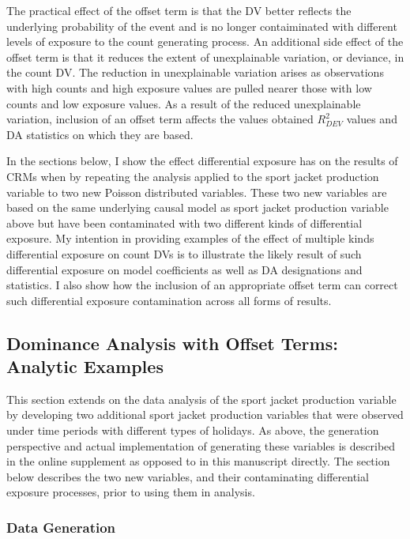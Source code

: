 \documentclass[ShortAfour,times,sageapa]{sagej}
\begin{document}
	The practical effect of the offset term is that the DV better reflects the underlying probability of the event and is no longer contaiminated with different levels of exposure to the count generating process.
	An additional side effect of the offset term is that it reduces the extent of unexplainable variation, or deviance, in the count DV.
	The reduction in unexplainable variation arises as observations with high counts and high exposure values are pulled nearer those with low counts and low exposure values.	
	As a result of the reduced unexplainable variation, inclusion of an offset term affects the values obtained $R^2_{DEV}$ values and DA statistics on which they are based.
	
	In the sections below, I show the effect differential exposure has on the results of CRMs when by repeating the analysis applied to the sport jacket production variable to two new Poisson distributed variables.
	These two new variables are based on the same underlying causal model as sport jacket production variable above but have been contaminated with two different kinds of differential exposure.
	My intention in providing examples of the effect of multiple kinds differential exposure on count DVs is to illustrate the likely result of such differential exposure on model coefficients as well as DA designations and statistics.
	I also show how the inclusion of an appropriate offset term can correct such differential exposure contamination across all forms of results.
	
	\subsection{Dominance Analysis with Offset Terms: Analytic Examples}
	
	This section extends on the data analysis of the sport jacket production variable by developing two additional sport jacket production variables that were observed under time periods with different types of holidays.	
	As above, the generation perspective and actual implementation of generating these variables is described in the online supplement as opposed to in this manuscript directly. The section below describes the two new variables, and their contaminating differential exposure processes, prior to using them in analysis.
	
		\subsubsection{Data Generation}
		
\end{document}
